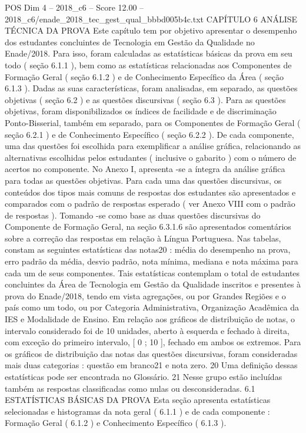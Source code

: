 \begin{textsample}{POS Dim 4 – 2018\_c6 – Score 12.00 – 2018\_c6/enade\_2018\_tec\_gest\_qual\_bbbd005b4c.txt}  \label{ex:f4_pos_014}
CAPÍTULO 6 ANÁLISE TÉCNICA DA PROVA Este capítulo tem por objetivo apresentar o desempenho dos estudantes concluintes de Tecnologia em Gestão da Qualidade no Enade/2018.
Para isso, foram calculadas as estatísticas básicas da prova em seu todo ( seção 6.1.1 ), bem como as estatísticas relacionadas aos Componentes de Formação Geral ( seção 6.1.2 ) e de Conhecimento Específico da Área ( seção 6.1.3 ).
Dadas as suas características, foram analisadas, em separado, as questões objetivas ( seção 6.2 ) e as questões discursivas ( seção 6.3 ).
Para as questões objetivas, foram disponibilizados os índices de facilidade e de discriminação Ponto-Bisserial, também em separado, para os Componentes de Formação Geral ( seção 6.2.1 ) e de Conhecimento Específico ( seção 6.2.2 ).
De cada componente, uma das questões foi escolhida para exemplificar a análise gráfica, relacionando as alternativas escolhidas pelos estudantes ( inclusive o gabarito ) com o número de acertos no componente.
No Anexo I, apresenta -se a íntegra da análise gráfica para todas as questões objetivas.
Para cada uma das questões discursivas, os conteúdos dos tipos mais comuns de respostas dos estudantes são apresentados e comparados com o padrão de respostas esperado ( ver Anexo VIII com o padrão de respostas ).
Tomando -se como base as duas questões discursivas do Componente de Formação Geral, na seção 6.3.1.6 são apresentados comentários sobre a correção das respostas em relação à Língua Portuguesa.
Nas tabelas, constam as seguintes estatísticas das notas20 : média do desempenho na prova, erro padrão da média, desvio padrão, nota mínima, mediana e nota máxima para cada um de seus componentes.
Tais estatísticas contemplam o total de estudantes concluintes da Área de Tecnologia em Gestão da Qualidade inscritos e presentes à prova do Enade/2018, tendo em vista agregações, ou por Grandes Regiões e o país como um todo, ou por Categoria Administrativa, Organização Acadêmica da IES e Modalidade de Ensino.
Em relação aos gráficos de distribuição de notas, o intervalo considerado foi de 10 unidades, aberto à esquerda e fechado à direita, com exceção do primeiro intervalo, [ 0 ; 10 ], fechado em ambos os extremos.
Para os gráficos de distribuição das notas das questões discursivas, foram consideradas mais duas categorias : questão em branco21 e nota zero. 20 Uma definição dessas estatísticas pode ser encontrada no Glossário. 21 Nesse grupo estão incluídas também as respostas classificadas como nulas ou desconsideradas. 6.1 ESTATÍSTICAS BÁSICAS DA PROVA Esta seção apresenta estatísticas selecionadas e histogramas da nota geral ( 6.1.1 ) e de cada componente : Formação Geral ( 6.1.2 ) e Conhecimento Específico ( 6.1.3 ).

\end{textsample}

